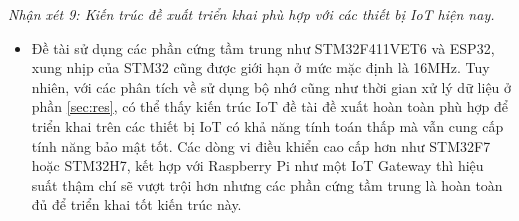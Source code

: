 \textit{Nhận xét 9: Kiến trúc đề xuất triển khai phù hợp với các thiết bị IoT hiện nay.}
\begin{itemize}
    \item Đề tài sử dụng các phần cứng tầm trung như STM32F411VET6 và ESP32, xung nhịp của STM32 cũng được giới hạn ở mức mặc  định là 16MHz. Tuy nhiên, với các phân tích về sử dụng bộ nhớ cũng như thời gian xử lý dữ liệu ở phần \ref{sec:res}, có thể thấy kiến trúc IoT đề tài đề xuất hoàn toàn phù hợp để triển khai trên các thiết bị IoT có khả năng tính toán thấp mà vẫn cung cấp tính năng bảo mật tốt. Các dòng vi điều khiển cao cấp hơn như STM32F7 hoặc STM32H7, kết hợp với Raspberry Pi như một IoT Gateway thì hiệu suất thậm chí sẽ vượt trội hơn nhưng các phần cứng tầm trung là hoàn toàn đủ để triển khai tốt kiến trúc này.
\end{itemize}


